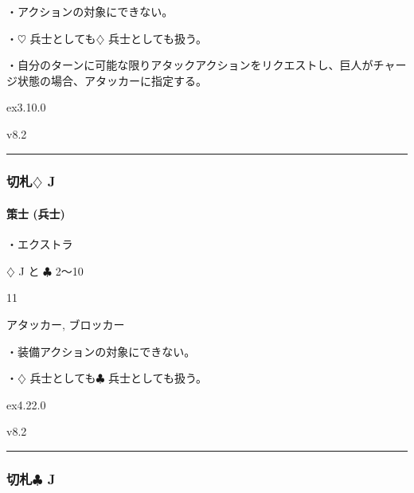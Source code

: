 \documentclass[letterpaper,10pt,dvipdfmx]{sphinxmanual}
\begin{document}
\sphinxAtStartPar
・アクションの対象にできない。

\sphinxAtStartPar
・{\normalsize $\heartsuit$} 兵士としても{\normalsize $\diamondsuit$} 兵士としても扱う。

\sphinxAtStartPar
・自分のターンに可能な限りアタックアクションをリクエストし、巨人がチャージ状態の場合、アタッカーに指定する。

\sphinxAtStartPar
{}  ex3.10.0

\sphinxAtStartPar
{}  v8.2


\bigskip\hrule\bigskip



\subsubsection{切札{\normalsize $\diamondsuit$} J}
\label{\detokenize{auto/frameActionlist:id99}}

\paragraph{策士 (兵士)}
\label{\detokenize{auto/frameActionlist:char-strategist}}\label{\detokenize{auto/frameActionlist:id100}}
\sphinxAtStartPar
{}

\sphinxAtStartPar
・エクストラ

\sphinxAtStartPar
{} {\normalsize $\diamondsuit$} J と {\normalsize $\clubsuit$} 2〜10

\sphinxAtStartPar
{} 11

\sphinxAtStartPar
{} アタッカー, ブロッカー

\sphinxAtStartPar
{}

\sphinxAtStartPar
・装備アクションの対象にできない。

\sphinxAtStartPar
・{\normalsize $\diamondsuit$} 兵士としても{\normalsize $\clubsuit$} 兵士としても扱う。

\sphinxAtStartPar
{}  ex4.22.0

\sphinxAtStartPar
{}  v8.2


\bigskip\hrule\bigskip



\subsubsection{切札{\normalsize $\clubsuit$} J}
\label{\detokenize{auto/frameActionlist:id101}}
\end{document}
